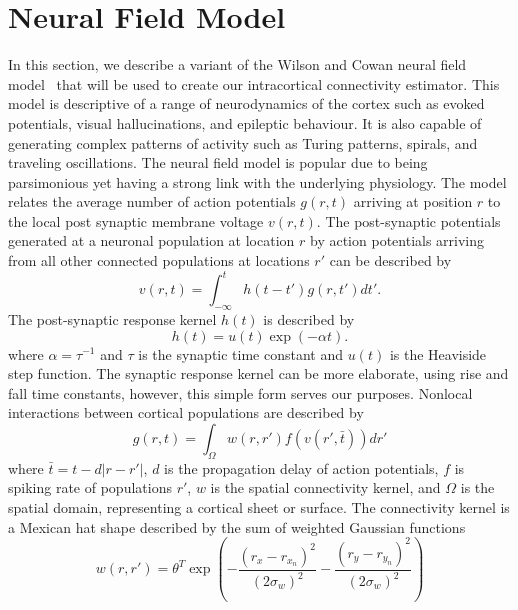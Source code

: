 \documentclass[onecolumn,draftcls]{IEEEtran}
\begin{document}
\section{Neural Field Model}
In this section, we describe a variant of the  Wilson and Cowan neural field model~\cite{Wilson1973} that will be used to create our intracortical connectivity estimator. This model is descriptive of a range of neurodynamics of the cortex such as evoked potentials, visual hallucinations, and epileptic behaviour. It is also capable of generating complex patterns of activity such as Turing patterns, spirals, and traveling oscillations. The neural field model is popular due to being parsimonious yet having a strong link with the underlying physiology.
The model relates the average number of action potentials $g(r,t)$ arriving at position $r$ to the local post synaptic membrane voltage $v(r,t)$. The post-synaptic potentials generated at a neuronal population at location $r$ by action potentials arriving from all other connected populations at locations $r'$ can be described by
\begin{equation}\label{SpikesToPotential}
	v\left( {r,t} \right) = \int_{ - \infty }^t {h\left( {t - t'} \right)g\left( {r,t'} \right)dt'}.
\end{equation}
The post-synaptic response kernel $h(t)$ is described by
\begin{equation}\label{SynapticRespKernel}
	h(t) = u(t)\exp{\left(-\alpha t\right)}.
\end{equation}
where $\alpha=\tau^{-1}$ and $\tau$ is the synaptic time constant and $u(t)$ is the Heaviside step function. The synaptic response kernel can be more elaborate, using rise and fall time constants, however, this simple form serves our purposes. Nonlocal interactions between cortical populations are described by	
\begin{equation}\label{RateBasedInteractions}
	g\left( r,t \right) = \int_\Omega  {w\left( r,r' \right)f\left( v\left( r',\bar t \right) \right)dr'}
\end{equation}
where $\bar t = t - d\left| {r - r'} \right|$, $d$ is the propagation delay of action potentials, $f$ is spiking rate of populations $r'$, $w$ is the spatial connectivity kernel, and $\Omega$ is the spatial domain, representing a cortical sheet or surface. The connectivity kernel is a Mexican hat shape described by the sum of weighted Gaussian functions
\begin{equation}
	w\left(r,r'\right) = \theta^T \exp{\left(-\frac{\left(r_x - r_{x_n}\right)^2}{\left(2\sigma_w\right)^2}-\frac{\left(r_y - r_{y_n}\right)^2}{\left(2\sigma_w\right)^2}\right)}
\end{equation}
\end{document}
